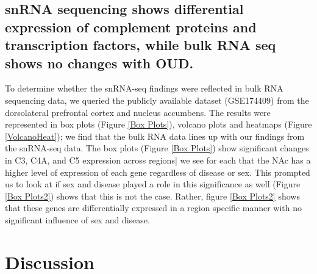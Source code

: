 \documentclass[10pt,letterpaper]{article}
\begin{document}
\subsection*{snRNA sequencing shows differential expression of complement proteins and transcription factors, while bulk RNA seq shows no changes with OUD.}
    To determine whether the snRNA-seq findings were reflected in bulk RNA sequencing data, we queried the publicly available dataset (GSE174409) from the dorsolateral prefrontal cortex and nucleus accumbens. The results were represented in box plots (Figure \ref{Box Plots}), volcano plots and heatmaps (Figure \ref{VolcanoHeat}); we find that the bulk RNA data lines up with our findings from the snRNA-seq data. The box plots (Figure \ref{Box Plots}) show significant changes in C3, C4A, and C5 expression across regions| we see for each that the NAc has a higher level of expression of each gene regardless of disease or sex. This prompted us to look at if sex and disease played a role in this significance as well (Figure \ref{Box Plots2}) shows that this is not the case. Rather, figure \ref{Box Plots2} shows that these genes are differentially expressed in a region specific manner with no significant influence of sex and disease.


\section*{Discussion}
\end{document}
